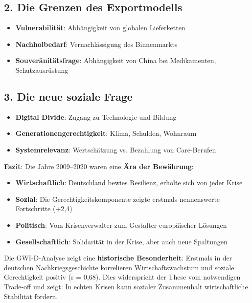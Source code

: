 \subsection{2. Die Grenzen des Exportmodells}

\begin{itemize}
    \item \textbf{Vulnerabilität}: Abhängigkeit von globalen Lieferketten
    \item \textbf{Nachholbedarf}: Vernachlässigung des Binnenmarkts
    \item \textbf{Souveränitätsfrage}: Abhängigkeit von China bei Medikamenten, Schutzausrüstung
\end{itemize}

\subsection{3. Die neue soziale Frage}

\begin{itemize}
    \item \textbf{Digital Divide}: Zugang zu Technologie und Bildung
    \item \textbf{Generationengerechtigkeit}: Klima, Schulden, Wohnraum
    \item \textbf{Systemrelevanz}: Wertschätzung vs. Bezahlung von Care-Berufen
\end{itemize}

\textbf{Fazit}: Die Jahre 2009–2020 waren eine \textbf{Ära der Bewährung}:

\begin{itemize}
    \item \textbf{Wirtschaftlich}: Deutschland bewies Resilienz, erholte sich von jeder Krise
    \item \textbf{Sozial}: Die Gerechtigkeitskomponente zeigte erstmals nennenswerte Fortschritte (+2,4)
    \item \textbf{Politisch}: Vom Krisenverwalter zum Gestalter europäischer Lösungen
    \item \textbf{Gesellschaftlich}: Solidarität in der Krise, aber auch neue Spaltungen
\end{itemize}

Die GWI-D-Analyse zeigt eine \textbf{historische Besonderheit}: Erstmals in der deutschen Nachkriegsgeschichte korrelieren Wirtschaftswachstum und
soziale Gerechtigkeit positiv (r = 0,68). Dies widerspricht der These vom notwendigen Trade-off und zeigt: In echten Krisen kann sozialer
Zusammenhalt wirtschaftliche Stabilität fördern.

